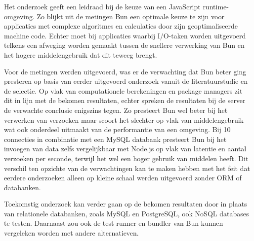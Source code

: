 Het onderzoek geeft een leidraad bij de keuze van een JavaScript runtime-omgeving.
Zo blijkt uit de metingen Bun een optimale keuze te zijn voor applicaties met complexe algoritmes en calculaties door zijn geoptimaliseerde machine code.
Echter moet bij applicaties waarbij I/O-taken worden uitgevoerd telkens een afweging worden gemaakt tussen de snellere verwerking van Bun en het hogere middelengebruik dat dit teweeg brengt.


Voor de metingen werden uitgevoerd, was er de verwachting dat Bun beter ging presteren op basis van eerder uitgevoerd onderzoek vanuit de literatuurstudie en de selectie.
Op vlak van computationele berekeningen en package managers zit dit in lijn met de bekomen resultaten, echter spreken de resultaten bij de server de verwachte conclusie enigszins tegen.
Zo presteert Bun wel beter bij het verwerken van verzoeken maar scoort het slechter op vlak van middelengebruik wat ook onderdeel uitmaakt van de performantie van een omgeving.
Bij 10 connecties in combinatie met een MySQL databank presteert Bun bij het invoegen van data zelfs vergelijkbaar met Node.js op vlak van latentie en aantal verzoeken per seconde, 
terwijl het wel een hoger gebruik van middelen heeft.
Dit verschil ten opzichte van de verwachtingen kan te maken hebben met het feit dat eerdere onderzoeken alleen op kleine schaal werden uitgevoerd zonder ORM of databanken.

Toekomstig onderzoek kan verder gaan op de bekomen resultaten door in plaats van relationele databanken, zoals MySQL en PostgreSQL, ook NoSQL databases te testen.
Daarnaast zou ook de test runner en bundler van Bun kunnen vergeleken worden met andere alternatieven.

